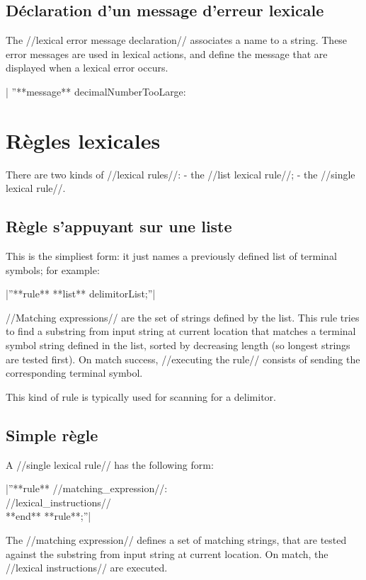 {\subsection{Déclaration d'un message d'erreur lexicale}

The //lexical error message declaration// associates a name to a string. These error messages are used in lexical actions, and define the message that are displayed when a lexical error occurs.

|  ''**message** decimalNumberTooLarge: %

 

\section{Règles lexicales}

There are two kinds of //lexical rules//:
  - the //list lexical rule//;
  - the //single lexical rule//.

\subsection{Règle s'appuyant sur une liste}

This is the simpliest form: it just names a previously defined list of terminal symbols; for example:

|''**rule** **list** delimitorList;''|

//Matching expressions// are the set of strings defined by the list. This rule tries to find a substring from input string at current location that matches a terminal symbol string defined in the list, sorted by decreasing length (so longest strings are tested first). On match success, //executing the rule// consists of sending the corresponding terminal symbol.

This kind of rule is typically used for scanning for a delimitor.

\subsection{Simple règle}

A //single lexical rule// has the following form:

|''**rule** //matching\_expression//:\\  //lexical\_instructions//\\ **end** **rule**;''|

The //matching expression// defines a set of matching strings, that are tested against the substring from input string at current location. On match, the //lexical instructions// are executed.

}
